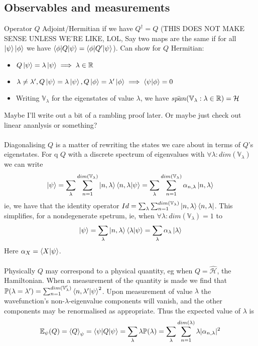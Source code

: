 \documentclass{article}
\begin{document}
\subsection{Observables and measurements}
Operator $Q$ Adjoint/Hermitian if we have $Q^\dagger=Q$ (THIS DOES NOT MAKE SENSE UNLESS WE'RE LIKE, LOL, Say two maps are the same if for all $\ket{\psi}\ket{\phi}$ we have $\braket{\phi |Q|\psi}=\braket{\phi|Q'|\psi}$).  Can show for $Q$ Hermitian:
\begin{itemize}
  \item $Q\ket{\psi}=\lambda\ket{\psi}\implies\lambda\in\mathbb{R}$
  \item $\lambda \neq \lambda',Q\ket{\psi}=\lambda\ket{\psi},Q\ket{\phi}=\lambda'\ket{\phi}\implies \braket{\psi|\phi}=0$
  \item Writing $\mathbb{V}_\lambda$ for the eigenstates of value $\lambda$, we have $\Bar{span}({\mathbb{V}_\lambda:\lambda\in\mathbb{R}})=\mathcal{H}$
\end{itemize}
Maybe I'll write out a bit of a rambling proof later.  Or maybe just check out linear ananlysis or something?
\\
\\
Diagonalising $Q$ is a matter of rewriting the states we care about in terms of $Q$'s eigenstates.  For q $Q$ with a discrete spectrum of eigenvalues with $\forall\lambda: dim(\mathbb{V}_\lambda)$ we can write
$$
  \ket{\psi}=\sum_\lambda\sum_{n=1}^{dim(\mathbb{V}_\lambda)}\ket{n,\lambda}\braket{n,\lambda|\psi}=\sum_\lambda\sum_{n=1}^{dim(\mathbb{V}_\lambda)}\alpha_{n,\lambda}\ket{n,\lambda}
$$
ie,  we have  that the identity operator $Id=\sum_\lambda\sum_{n=1}^{dim(\mathbb{V}_\lambda)}\ket{n,\lambda}\bra{n,\lambda}$.  This simplifies, for a nondegenerate spetrum, ie, when $\forall\lambda:dim(\mathbb{V}_\lambda)=1$ to
$$
  \ket{\psi}=\sum_\lambda\ket{n,\lambda}\braket{\lambda|\psi}=\sum_\lambda\alpha_{\lambda}\ket{\lambda}
$$
Here $\alpha_X=\braket{X|\psi}$.
\\
\\
Physically $Q$ may correspond to a physical quantity, eg when $Q=\hat{\mathcal{H}}$, the Hamiltonian.  When a measurement of the quantity is made we find that $\mathbb{P}(\lambda=\lambda')=\sum_{n=1}^{dim(\mathbb{V}_\lambda')}\braket{n,\lambda'|\psi}^2$.  Upon measurement of value $\lambda$ the wavefunction's non-$\lambda$-eigenvalue components will vanish, and the other components may be renormalised as appropriate.  Thus the expected value of $\lambda$ is
$$
  \mathbb{E}_\psi(Q)=\braket{Q}_\psi=\braket{\psi|Q|\psi}=\sum_\lambda\lambda\mathbb{P}(\lambda)=\sum_\lambda\sum_{n=1}^{dim(\lambda)}\lambda|\alpha_{n,\lambda}|^2
$$
\end{document}
